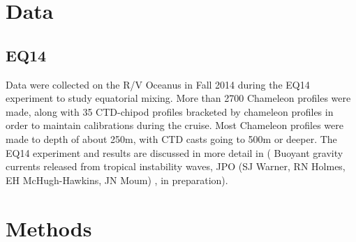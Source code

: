 \documentclass{ametsoc}
\begin{document}
\section{Data }


\subsection{EQ14}

Data were collected on the R/V Oceanus in Fall 2014 during the EQ14 experiment to study equatorial mixing.  More than 2700 Chameleon profiles were made, along with 35 CTD-chipod profiles bracketed by chameleon profiles in order to maintain calibrations during the cruise. Most Chameleon profiles were made to depth of about 250m, with CTD casts going to 500m or deeper. The EQ14 experiment and results are discussed in more detail in ( Buoyant gravity currents released from tropical instability waves, JPO (SJ Warner, RN Holmes, EH McHugh-Hawkins, JN Moum) , in preparation).




\section{Methods}



\end{document}
